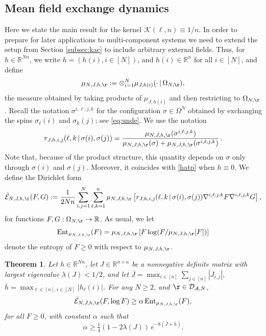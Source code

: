 \documentclass[11pt,reqno]{amsart}
\numberwithin{equation}{section}
\numberwithin{figure}{section}
\newtheorem{theorem}{Theorem}[section]
\renewcommand{\geq}{\ge} %
\newcommand{\1}{\mathds{1}}
\newcommand{\tc}{\,|\,}
\let\a=\alpha \let\b=\beta \let\g=\gamma \let\d=\delta
\let\si=\sigma
\let\O=\Omega
\newcommand{\cA}{\ensuremath{\mathcal A}}
\newcommand{\cD}{\ensuremath{\mathcal D}}
\newcommand{\cK}{\ensuremath{\mathcal K}}
\newcommand{\bbR}{{\ensuremath{\mathbb R}} }
\begin{document}
\subsection{Mean field exchange dynamics}
Here we state the main result for the kernel $\cK(\ell,n)\equiv1/n$. In order to prepare for later applications to multi-component systems we need to extend the setup from Section \ref{subsec:kac} to include arbitrary external fields. Thus, for $h\in\bbR^{Nn}$, we write $h=(h(i),i\in[N])$, and $h(i)\in\bbR^n$ for all $i\in[N]$, and define
\begin{equation}\label{eq:pbm2}
\mu_{N,J,h,\r}:=\otimes_{i=1}^N\mu_{J,h(i)}(\cdot\tc\O_{N,\r}), 
\end{equation} 
the measure obtained by taking products of $\mu_{J,h(i)}$ and then restricting to  $\O_{N,\r}$.
Recall the notation $\si^{i,\ell;j,k}$ for the configuration $\si\in\O^N$ obtained by exchanging the spins $\si_\ell(i)$ and $\si_k(j)$; see \eqref{eq:unde}.  We use the notation 
 \begin{equation}\label{gxk33}
    r_{J,h,i,j}(\ell,k\tc\sigma(i),\sigma(j))=
 \frac{ \mu_{N,J,h,\r}(\si^{i,\ell;j,k})}{\mu_{N,J,h,\r}(\si)+\mu_{N,J,h,\r}(\si^{i,\ell;j,k})}\,.
\end{equation}
Note that, because of the product structure, this quantity depends on $\si $ only through $\si(i)$ and $\si(j)$. Moreover, it coincides with \eqref{hatp} when $h\equiv 0$. We define the Dirichlet form 
\begin{equation}\label{bar-DF}
\bar{\mathcal{E}}_{N, J,h,\r}(F, G) := \frac{1}{2Nn} \sum_{i,j=1}^N \sum_{\ell,k =1}^n \mu_{N,J,h,\r}\left[  r_{J,h,i,j}(\ell,k\tc\sigma(i),\sigma(j)) \nabla^{i,\ell;j,k}F\nabla^{i,\ell;j,k}G \right],
\end{equation}
for functions \(F, G : \O_{N,\r} \to \mathbb{R}\). As usual, we let 
\[
\operatorname{Ent}_{\mu_{N,J,h,\r}}(F)=\mu_{N,J,h,\r}\left[F\log(F/\mu_{N,J,h,\r}[F])\right]
\] denote the entropy of $F\ge 0$ with respect to $\mu_{N,J,h,\r}$.
\begin{theorem}\label{th:MLSI-MF}
Let $h\in\bbR^{Nn}$, let \(J\in\bbR^{n\times n}\) be a nonnegative definite matrix with largest eigenvalue \(\lambda(J) < 1/2\), and let  
\(\overline{J}=\max_{i\in [n]} \sum_{j\in [n]}|J_{i,j}|\), \(\overline{h}=\max_{\ell\in [n], i\in[N]}|h_\ell(i)|\). 
For any $N\ge 2$, and $\r\in \cD_{\cA,N}$, 
\begin{equation}\label{eq:MLSI-MF1}
\bar{\mathcal{E}}_{N, J,h,\r}(F, \log F) \ge \a\operatorname{Ent}_{\mu_{N,J,h,\r}}(F),
\end{equation}
for all $F\ge 0$, with constant  $\a$ such that  
  \begin{equation}\label{eq:MLSI-MF2}
        \alpha \geq \tfrac14(1 - 2\lambda(J))\,e^{-8(\overline{J}+\overline{h})}.
   \end{equation}
\end{theorem}
\end{document}

